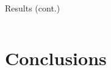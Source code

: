 \documentclass[aspectratio=169,xcolor=dvipsnames]{beamer}
\begin{document}
\begin{frame}{Results (cont.)}
\begin{columns}[c]




        
    \end{columns}
\end{frame}

\section{Conclusions}
\end{document}

